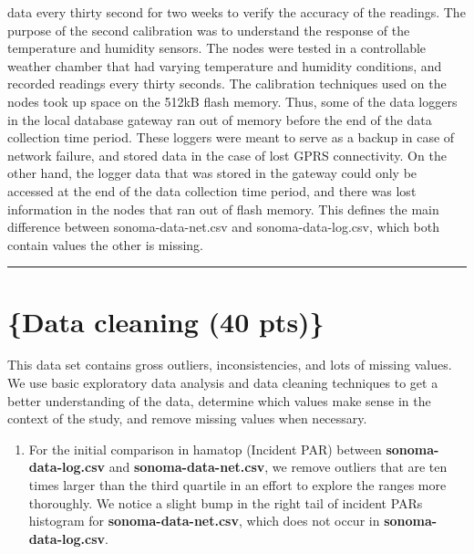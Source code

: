 \documentclass[]{article}
\providecommand{\tightlist}{%
  \setlength{\itemsep}{0pt}\setlength{\parskip}{0pt}}
\begin{document}
data every thirty second for two weeks to verify the accuracy of the
readings. The purpose of the second calibration was to understand the
response of the temperature and humidity sensors. The nodes were tested
in a controllable weather chamber that had varying temperature and
humidity conditions, and recorded readings every thirty seconds. The
calibration techniques used on the nodes took up space on the 512kB
flash memory. Thus, some of the data loggers in the local database
gateway ran out of memory before the end of the data collection time
period. These loggers were meant to serve as a backup in case of network
failure, and stored data in the case of lost GPRS connectivity. On the
other hand, the logger data that was stored in the gateway could only be
accessed at the end of the data collection time period, and there was
lost information in the nodes that ran out of flash memory. This defines
the main difference between sonoma-data-net.csv and sonoma-data-log.csv,
which both contain values the other is missing.

\begin{center}\rule{0.5\linewidth}{\linethickness}\end{center}

\section{\{Data cleaning (40 pts)\}}\label{data-cleaning-40-pts}

This data set contains gross outliers, inconsistencies, and lots of
missing values. We use basic exploratory data analysis and data cleaning
techniques to get a better understanding of the data, determine which
values make sense in the context of the study, and remove missing values
when necessary.

\begin{enumerate}
\def\labelenumi{\arabic{enumi}.}
\tightlist
\item
  For the initial comparison in hamatop (Incident PAR) between
  \textbf{sonoma-data-log.csv} and \textbf{sonoma-data-net.csv}, we
  remove outliers that are ten times larger than the third quartile in
  an effort to explore the ranges more thoroughly. We notice a slight
  bump in the right tail of incident PARs histogram for
  \textbf{sonoma-data-net.csv}, which does not occur in
  \textbf{sonoma-data-log.csv}.
\end{enumerate}
\end{document}
